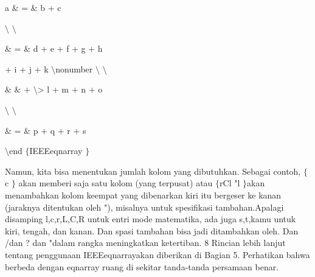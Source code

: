 \vspace{12pt}
\noindent 
a  $  \&  $ =  $  \&  $ b + c \par
\vspace{12pt}
\noindent 
 $  \setminus  $ $  \setminus  $ \par
\vspace{12pt}
\noindent 
 $  \&  $ =  $  \&  $ d + e + f + g + h \par
\vspace{12pt}
\noindent 
+ i + j + k  $  \setminus  $nonumber $  \setminus  $ $  \setminus  $ \par
\vspace{12pt}
\noindent 
 $  \&  $ $  \&  $ + $  \setminus  $> l + m + n + o \par
\vspace{12pt}
\noindent 
 $  \setminus  $ $  \setminus  $ \par
\vspace{12pt}
\noindent 
 $  \&  $ =  $  \&  $ p + q + r + s \par
\vspace{12pt}
\noindent 
 $  \setminus  $end $  \{  $IEEEeqnarray $  \}  $ \par
\vspace{12pt}
\vspace{16pt}
\noindent 
 \hspace*{0.5in} Namun, kita bisa menentukan jumlah kolom yang dibutuhkan. Sebagai contoh,  $  \{  $c $  \}  $ akan memberi saja satu kolom (yang terpusat) atau  $  \{  $rCl "l $  \}  $akan menambahkan kolom keempat yang dibenarkan kiri itu bergeser ke kanan (jaraknya ditentukan oleh "), misalnya untuk spesifikasi tambahan.Apalagi disamping l,c,r,L,C,R untuk entri mode matematika, ada juga s,t,kamu untuk kiri, tengah, dan kanan. Dan spasi tambahan bisa jadi ditambahkan oleh. Dan /dan ? dan "dalam rangka meningkatkan ketertiban. 8 Rincian lebih lanjut tentang penggunaan IEEEeqnarrayakan diberikan di Bagian 5. Perhatikan bahwa berbeda dengan eqnarray ruang di sekitar tanda-tanda persamaan benar. \par
\vspace{12pt}
\noindent 
